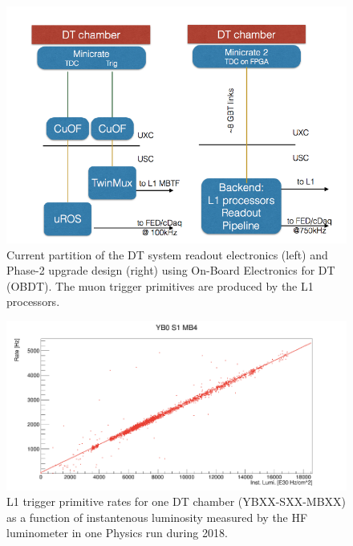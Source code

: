 \begin{figure}[hbtp]
\centering
\includegraphics[width=.7\linewidth]{tex/Part2/fig/DT/DT-DAQ-Phase1_vs_Phase2.png}
\caption{Current partition of the DT system readout electronics (left) and Phase-2 upgrade design (right) using On-Board Electronics for DT (OBDT).
  The muon trigger primitives are produced by the L1 processors.
}   
\label{fig:DT_DAQ2}
\end{figure}


\begin{figure}[hbtp]
\centering
\includegraphics[width=.7\linewidth]{tex/Part2/fig/DT/DT-Linearity.png}
\caption{L1 trigger primitive rates for one DT chamber (YBXX-SXX-MBXX) as a function of instantenous luminosity measured by the HF luminometer in one Physics run during 2018.} 
\label{fig:DT_linearity}
\end{figure}


